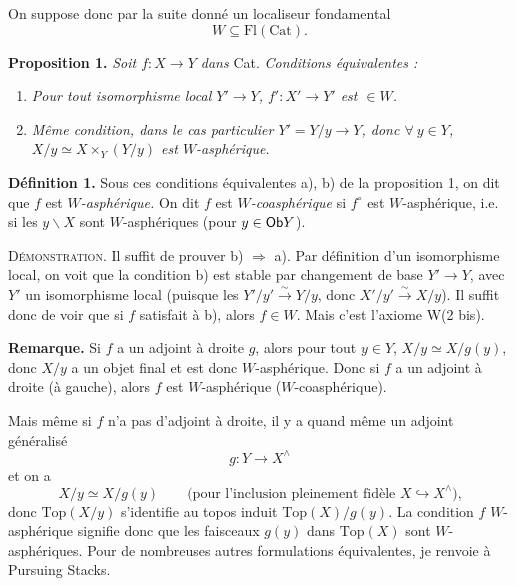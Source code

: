 On suppose donc par la suite donné un localiseur fondamental
\[
W \subseteq \mathrm{Fl}(\mathrm{Cat}).
\]

\textbf{Proposition 1.} \textit{Soit $f : X \longrightarrow Y$ dans} \textup{Cat}. \textit{Conditions équivalentes :}

\begin{enumerate}
\item[\textit{a)}] \textit{Pour tout isomorphisme local $Y' \longrightarrow Y$, $f' : X' \longrightarrow Y'$ est $\in W$.}
\item[\textit{b)}] \textit{Même condition, dans le cas particulier $Y' = Y/y \longrightarrow Y$, donc $\forall\ y \in Y$, $X/y \simeq X \times_Y (Y/y)$ est $W$-asphérique.}
\end{enumerate}

\textbf{Définition 1.} Sous ces conditions équivalentes a), b) de la proposition 1, on dit que $f$ est \textit{$W$-asphérique.} On dit $f$ est \textit{$W$-coasphérique} si $f^{\circ}$ est $W$-asphérique, i.e. si les $y\backslash X$ sont $W$-asphériques (pour $y \in \mathsf{Ob} Y$).

\textsc{Démonstration.} Il suffit de prouver b) $\Longrightarrow$ a). Par définition d'un isomorphisme local, on voit que la condition b) est stable par changement de base $Y' \longrightarrow Y$, avec $Y'$ un isomorphisme local (puisque les $Y'/y' \xrightarrow{\sim} Y/y$, donc $X'/y' \xrightarrow{\sim} X/y$). Il suffit donc de voir que si $f$ satisfait à b), alors $f \in W$. Mais c'est l'axiome W(2 bis).

\begin{center}
\end{center}


\textbf{Remarque.} Si $f$ a un adjoint à droite $g$, alors pour tout $y \in Y$, $X/y \simeq X/g(y)$, donc $X/y$ a un objet final et est donc $W$-asphérique. Donc si $f$ a un adjoint à droite (à gauche), alors $f$ est $W$-asphérique ($W$-coasphérique).

Mais même si $f$ n'a pas d'adjoint à droite, il y a quand même un adjoint généralisé
\[
g : Y \longrightarrow X^{\wedge}
\]
et on a
\[
X/y \simeq X/g(y) \qquad \text{(pour l'inclusion pleinement fidèle $X \hookrightarrow X^{\wedge}$),}
\]
donc $\mathrm{Top}(X/y)$ s'identifie au topos induit $\mathrm{Top}(X)/g(y)$. La condition $f$ $W$-asphérique signifie donc que les faisceaux $g(y)$ dans $\mathrm{Top}(X)$ sont
$W$-asphériques. Pour de nombreuses autres formulations équivalentes, je renvoie à Pursuing Stacks.

